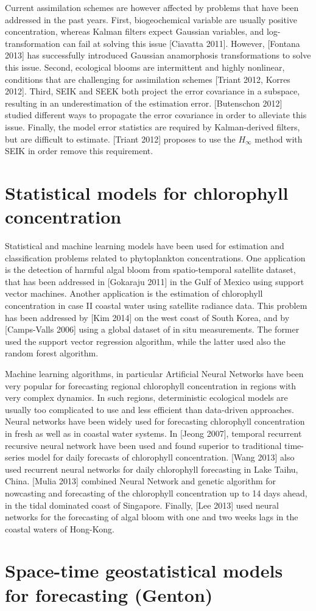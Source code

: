 Current assimilation schemes are however affected by problems that have been addressed in the past years. First, biogeochemical variable are usually positive concentration, whereas Kalman filters expect Gaussian variables, and log-transformation can fail at solving this issue [Ciavatta 2011]. However, [Fontana 2013] has successfully introduced Gaussian anamorphosis transformations to solve this issue. Second, ecological blooms are intermittent and highly nonlinear, conditions that are challenging for assimilation schemes [Triant 2012, Korres 2012]. Third, SEIK and SEEK both project the error covariance in a subspace, resulting in an underestimation of the estimation error. [Butenschon 2012] studied different ways to propagate the error covariance in order to alleviate this issue. Finally, the model error statistics are required by Kalman-derived filters, but are difficult to estimate. [Triant 2012] proposes to use the $H_\infty$ method with SEIK in order remove this requirement.

\section{Statistical models for chlorophyll concentration}

Statistical and machine learning models have been used for estimation and classification problems related to phytoplankton concentrations. One application is the detection of harmful algal bloom from spatio-temporal satellite dataset, that has been addressed in [Gokaraju 2011] in the Gulf of Mexico using support vector machines. Another application is the estimation of chlorophyll concentration in case II coastal water using satellite radiance data. This problem has been addressed by [Kim 2014] on the west coast of South Korea, and by [Camps-Valls 2006] using a global dataset of in situ measurements. The former used the support vector regression algorithm, while the latter used also the random forest algorithm. 

Machine learning algorithms, in particular Artificial Neural Networks have been very popular for forecasting regional chlorophyll concentration in regions with very complex dynamics. In such regions, deterministic ecological models are usually too complicated to use and less efficient than data-driven approaches. Neural networks have been widely used for forecasting chlorophyll concentration in fresh as well as in coastal water systems. In [Jeong 2007], temporal recurrent recursive neural network have been used and found superior to traditional time-series model for daily forecasts of chlorophyll concentration. [Wang 2013] also used recurrent neural networks for daily chlorophyll forecasting in Lake Taihu, China. [Mulia 2013] combined Neural Network and genetic algorithm for nowcasting and forecasting of the chlorophyll concentration up to 14 days ahead, in the tidal dominated coast of Singapore. Finally, [Lee 2013] used neural networks for the forecasting of algal bloom with one and two weeks lags in the coastal waters of Hong-Kong. 

\section{Space-time geostatistical models for forecasting (Genton)}


